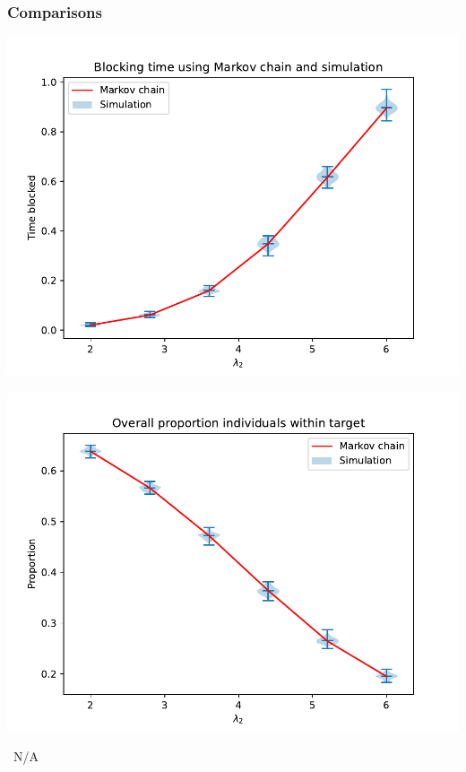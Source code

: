\begin{frame}
    \frametitle{Comparisons}

    \setlength{\columnseprule}{1pt}
    \begin{multicols}{3}
        \centering
        \includegraphics[scale=0.2]{Bin/performance_measures_comparison/blocking_comparison.pdf}

        \includegraphics[scale=0.2]{Bin/performance_measures_comparison/proportion_overall_comparison.pdf}
        
        \columnbreak

        \centering
        \vspace*{0.05cm}
        \Huge{\, N/A}
        \vspace{0.75cm}


\end{multicols}
\end{frame}
